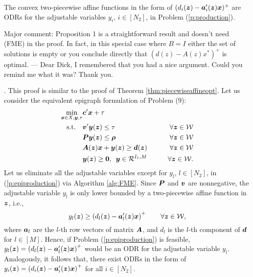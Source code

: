 \documentclass[fleqn,orsc,blindrev]{informs4}
\newcommand{\mb}[1]{\mbox{\boldmath \ensuremath{#1}}}
\begin{document}
	\begin{proposition} \label{prop:2piecewiseaffineopt}
		The convex two-piecewise affine functions in the form of $(d_i(\mb{z})-\mb{a}'_i(\mb{z})\mb{x})^+$ are ODRs for the adjustable variables $y_i$, $i\in [N_2]$, in Problem (\ref{p:production}).
	\end{proposition}
	
	 {Major comment: Proposition 1 is a straightforward result and doesn’t need (FME) in the proof. In fact, in this special case where $B = I$ either the set of solutions is empty or you conclude directly that $(d(z)- A(z)x^*)^+$ is optimal. --- Dear Dick, I remembered that you had a nice argument. Could you remind me what it was? Thank you.}
	
	. This proof is similar to the proof of Theorem \ref{thm:piecewiseaffineopt}. Let us consider the equivalent epigraph formulation of Problem (9):
\begin{equation} \label{p:epiproduction}
		\begin{aligned} 
		\min_{ \boldsymbol{x} \in X,  \boldsymbol{y}, \tau}  &  \mb{c}'\mb{x} +  \tau \\
		{\rm s.t.} \quad  &    \mb{v}'\mb{y}(\mb{z}) \le  \tau \qquad & \forall \mb{z} \in \mathcal{W}\\
		&\mb{P}\mb{y}(\mb{z}) \le \mb{\rho} \qquad & \forall \mb{z} \in \mathcal{W} \\
		& \mb{A}(\mb{z})\mb{x} + \mb{y}(\mb{z}) \ge \mb{d}(\mb{z}) \qquad & \forall \mb{z} \in \mathcal{W} \\
		& \mb{y}(\mb{z}) \ge \mb{0}, \,\,\,  \mb{y} \in \mathcal{R}^{I_1,M} & \forall \mb{z} \in \mathcal{W}.
		\end{aligned}
\end{equation}
	Let us eliminate all the adjustable variables except for $y_{l}$, $l \in [N_2]$, in (\ref{p:epiproduction}) via Algorithm \ref{alg:FME}.  Since $\mb{P}$ and $\mb{v}$ are nonnegative, the adjustable variable $y_{l}$ is only lower bounded by a two-piecewise affine function in $\mb{z}$, i.e.,
\begin{equation*}
	 y_{l}(\mb{z}) \ge \left(d_l(\mb{z})-\mb{a}'_l(\mb{z})\mb{x} \right)^+  \qquad \forall \mb{z} \in \mathcal{W},
\end{equation*}
	where $\mb{a}_l$ are the $l$-th row vectors of matrix $\mb{A}$, and $d_l$ is the $l$-th component of $\mb{d}$ for $l \in [M]$. Hence, if Problem (\ref{p:epiproduction}) is feasible, $y_{l}(\mb{z}) = \left( d_l(\mb{z})-\mb{a}'_l(\mb{z})\mb{x}\right)^+$ would be an ODR for the adjustable variable $y_l$. Analogously, it follows that, there exist ODRs in the form of  $y_{i}(\mb{z})=\left( d_i(\mb{z})-\mb{a}'_i(\mb{z})\mb{x}\right)^+$ for all $i\in [N_2]$. 	 \hfill \Halmos\\
\end{document}
